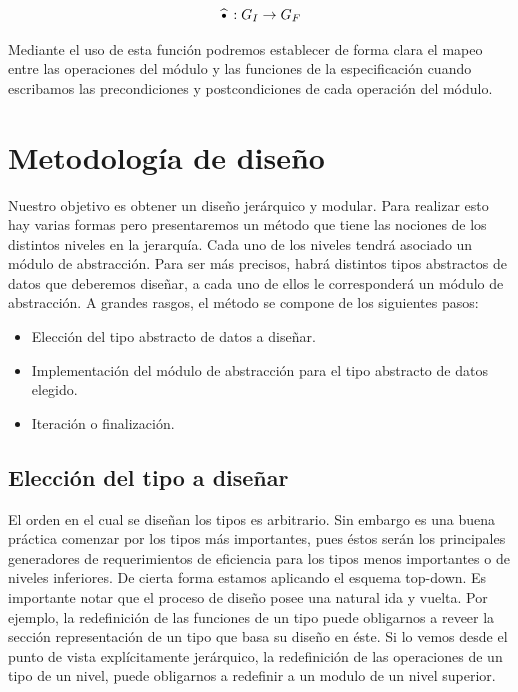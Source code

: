 \begin{equation*}
 \widehat{\text{\textbullet}}: G_I \rightarrow G_F
\end{equation*}

Mediante el uso de esta funci\'on podremos establecer de forma clara el mapeo entre las operaciones del m\'odulo y las funciones de la especificaci\'on cuando escribamos las precondiciones y postcondiciones de cada operaci\'on del m\'odulo.

\newpage

\section{Metodolog\'ia de dise\~no}

Nuestro objetivo es obtener un dise\~no jer\'arquico y modular. Para realizar esto hay varias formas pero presentaremos un m\'etodo que tiene las nociones de los distintos niveles en la jerarqu\'ia. Cada uno de los niveles tendr\'a asociado un m\'odulo de abstracci\'on. Para ser m\'as precisos, habr\'a distintos tipos abstractos de datos que deberemos dise\~nar, a cada uno de ellos le corresponder\'a un m\'odulo de abstracci\'on. A grandes rasgos, el m\'etodo se compone de los siguientes pasos:

\begin{itemize}
 \item Elecci\'on del tipo abstracto de datos a dise\~nar.
 \item Implementaci\'on del m\'odulo de abstracci\'on para el tipo abstracto de datos elegido.
 \item Iteraci\'on o finalizaci\'on.
\end{itemize}

\subsection{Elecci\'on del tipo a dise\~nar}

El orden en el cual se dise\~nan los tipos es arbitrario. Sin embargo es una buena pr\'actica comenzar por los tipos m\'as importantes, pues \'estos ser\'an los principales generadores de requerimientos de eficiencia para los tipos menos importantes o de niveles inferiores. De cierta forma estamos aplicando el esquema top-down. Es importante notar que el proceso de dise\~no posee una natural ida y vuelta. Por ejemplo, la redefinici\'on de las funciones de un tipo puede obligarnos a reveer la secci\'on representaci\'on de un tipo que basa su dise\~no en \'este. Si lo vemos desde el punto de vista expl\'icitamente jer\'arquico, la redefinici\'on de las operaciones de un tipo de un nivel, puede obligarnos a redefinir a un modulo de un nivel superior.

